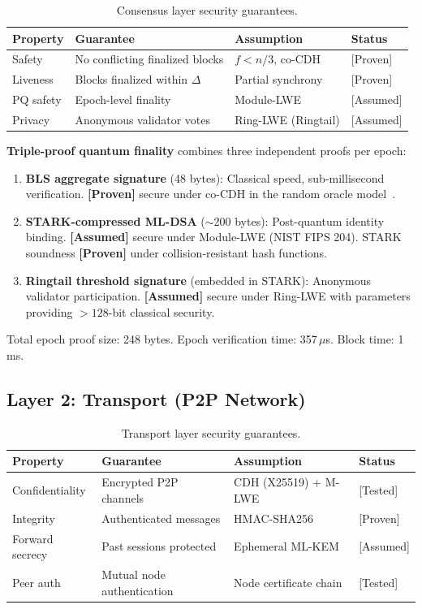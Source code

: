 \documentclass[11pt,a4paper]{article}
\begin{document}
\begin{table}[ht]
\centering
\caption{Consensus layer security guarantees.}
\label{tab:consensus-security}
\begin{tabular}{llll}
\toprule
\textbf{Property} & \textbf{Guarantee} & \textbf{Assumption} & \textbf{Status} \\
\midrule
Safety & No conflicting finalized blocks & $f < n/3$, co-CDH & [Proven] \\
Liveness & Blocks finalized within $\Delta$ & Partial synchrony & [Proven] \\
PQ safety & Epoch-level finality & Module-LWE & [Assumed] \\
Privacy & Anonymous validator votes & Ring-LWE (Ringtail) & [Assumed] \\
\bottomrule
\end{tabular}
\end{table}

\textbf{Triple-proof quantum finality} combines three independent proofs per epoch:

\begin{enumerate}[leftmargin=2em]
  \item \textbf{BLS aggregate signature} (48 bytes): Classical speed, sub-millisecond
        verification. \textbf{[Proven]} secure under co-CDH in the random oracle
        model~\cite{boneh2001bls}.
  \item \textbf{STARK-compressed ML-DSA} ($\sim$200 bytes): Post-quantum identity
        binding. \textbf{[Assumed]} secure under Module-LWE (NIST FIPS 204). STARK
        soundness \textbf{[Proven]} under collision-resistant hash functions.
  \item \textbf{Ringtail threshold signature} (embedded in STARK): Anonymous
        validator participation. \textbf{[Assumed]} secure under Ring-LWE with
        parameters providing $> 128$-bit classical security.
\end{enumerate}

Total epoch proof size: 248 bytes. Epoch verification time: 357\,$\mu$s.
Block time: 1\,ms.

\subsection{Layer 2: Transport (P2P Network)}

\begin{table}[ht]
\centering
\caption{Transport layer security guarantees.}
\label{tab:transport-security}
\begin{tabular}{llll}
\toprule
\textbf{Property} & \textbf{Guarantee} & \textbf{Assumption} & \textbf{Status} \\
\midrule
Confidentiality & Encrypted P2P channels & CDH (X25519) + M-LWE & [Tested] \\
Integrity & Authenticated messages & HMAC-SHA256 & [Proven] \\
Forward secrecy & Past sessions protected & Ephemeral ML-KEM & [Assumed] \\
Peer auth & Mutual node authentication & Node certificate chain & [Tested] \\
\bottomrule
\end{tabular}
\end{table}
\end{document}
